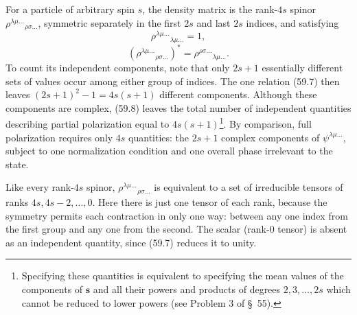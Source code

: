 For a particle of arbitrary spin $s$, the density matrix is the rank-$4s$
spinor $\rho^{\lambda\mu\ldots}{}_{\rho\sigma\ldots}$, symmetric separately
in the first $2s$ and last $2s$ indices, and satisfying
\begin{equation}
 \rho^{\lambda\mu\ldots}{}_{\lambda\mu\ldots}=1,
 \tag{59.7}
\end{equation}
\begin{equation}
 (\rho^{\lambda\mu\ldots}{}_{\rho\sigma\ldots})^*
 =\rho^{\rho\sigma\ldots}{}_{\lambda\mu\ldots}.
 \tag{59.8}
\end{equation}
To count its independent components, note that only $2s+1$ essentially
different sets of values occur among either group of indices. The one
relation (59.7) then leaves $(2s+1)^2-1=4s(s+1)$ different components.
Although these components are complex, (59.8) leaves the total number of
independent quantities describing partial polarization equal to
$4s(s+1)$\footnote{Specifying these quantities is equivalent to specifying
the mean values of the components of $\mathbf s$ and all their powers and
products of degrees $2,3,\ldots,2s$ which cannot be reduced to lower powers
(see Problem 3 of \S~55).}. By comparison, full polarization requires only
$4s$ quantities: the $2s+1$ complex components of
$\psi^{\lambda\mu\ldots}$, subject to one normalization condition and one
overall phase irrelevant to the state.

Like every rank-$4s$ spinor,
$\rho^{\lambda\mu\ldots}{}_{\rho\sigma\ldots}$ is equivalent to a set of
irreducible tensors of ranks $4s,4s-2,\ldots,0$. Here there is just one tensor
of each rank, because the symmetry permits each contraction in only one way:
between any one index from the first group and any one from the second. The
scalar (rank-0 tensor) is absent as an independent quantity, since (59.7)
reduces it to unity.
